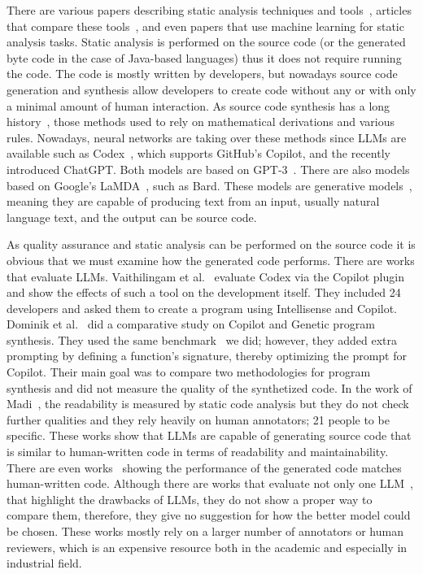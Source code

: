 There are various papers describing static analysis techniques and tools~\cite{static_analyzer1, static_analyzer2}, articles that compare these tools~\cite{static_analyzer_comparison}, and even papers that use machine learning for static analysis tasks\cite{rex}.
Static analysis is performed on the source code (or the generated byte code in the case of Java-based languages) thus it does not require running the code.
The code is mostly written by developers, but nowadays source code generation and synthesis allow developers to create code without any or with only a minimal amount of human interaction.
As source code synthesis has a long history~\cite{early_program_synthesis}, those methods used to rely on mathematical derivations and various rules.
Nowadays, neural networks are taking over these methods since LLMs are available such as Codex~\cite{codex}, which supports GitHub's Copilot, and the recently introduced ChatGPT.
Both models are based on GPT-3~\cite{gpt3}.
There are also models based on Google's LaMDA~\cite{lamda}, such as Bard.
These models are generative models~\cite{generative_models}, meaning they are capable of producing text from an input, usually natural language text, and the output can be source code.

As quality assurance and static analysis can be performed on the source code it is obvious that we must examine how the generated code performs.
There are works that evaluate LLMs.
Vaithilingam et al.~\cite{copilot_code_evaluation} evaluate Codex via the Copilot plugin and show the effects of such a tool on the development itself.
They included 24 developers and asked them to create a program using Intellisense and Copilot.
Dominik et al.~\cite{copilot_code_evaluation2} did a comparative study on Copilot and Genetic program synthesis.
They used the same benchmark~\cite{codegen_benchmark} we did; however, they added extra prompting by defining a function’s signature, thereby optimizing the prompt for Copilot.
Their main goal was to compare two methodologies for program synthesis and did not measure the quality of the synthetized code.
In the work of Madi~\cite{copilot_code_evaluation_3}, the readability is measured by static code analysis but they do not check further qualities and they rely heavily on human annotators; 21 people to be specific.
These works show that LLMs are capable of generating source code that is similar to human-written code in terms of readability and maintainability.
There are even works~\cite{copilot_code_similar_performance} showing the performance of the generated code matches human-written code.
Although there are works that evaluate not only one LLM~\cite{fix_program_synthesis_models}, that highlight the drawbacks of LLMs, they do not show a proper way to compare them, therefore, they give no suggestion for how the better model could be chosen.
These works mostly rely on a larger number of annotators or human reviewers, which is an expensive resource both in the academic and especially in industrial field.

